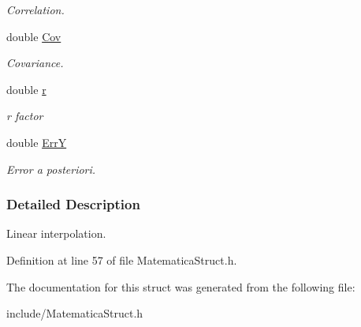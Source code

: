 \begin{DoxyCompactItemize}
\begin{DoxyCompactList}\small\item\em Correlation. \end{DoxyCompactList}\item 
double \hyperlink{structRETTA_a8e12192aad40946228d8a4edc7dceb7f}{Cov}\hypertarget{structRETTA_a8e12192aad40946228d8a4edc7dceb7f}{}\label{structRETTA_a8e12192aad40946228d8a4edc7dceb7f}

\begin{DoxyCompactList}\small\item\em Covariance. \end{DoxyCompactList}\item 
double \hyperlink{structRETTA_a880a49112fedae68e714341a9a082fb6}{r}\hypertarget{structRETTA_a880a49112fedae68e714341a9a082fb6}{}\label{structRETTA_a880a49112fedae68e714341a9a082fb6}

\begin{DoxyCompactList}\small\item\em r factor \end{DoxyCompactList}\item 
double \hyperlink{structRETTA_a8ca6dcd2c4b3c13b0164f59283c4dd28}{ErrY}\hypertarget{structRETTA_a8ca6dcd2c4b3c13b0164f59283c4dd28}{}\label{structRETTA_a8ca6dcd2c4b3c13b0164f59283c4dd28}

\begin{DoxyCompactList}\small\item\em Error a posteriori. \end{DoxyCompactList}\end{DoxyCompactItemize}


\subsubsection{Detailed Description}
Linear interpolation. 

Definition at line 57 of file Matematica\+Struct.\+h.



The documentation for this struct was generated from the following file\+:\begin{DoxyCompactItemize}
\item 
include/Matematica\+Struct.\+h\end{DoxyCompactItemize}
